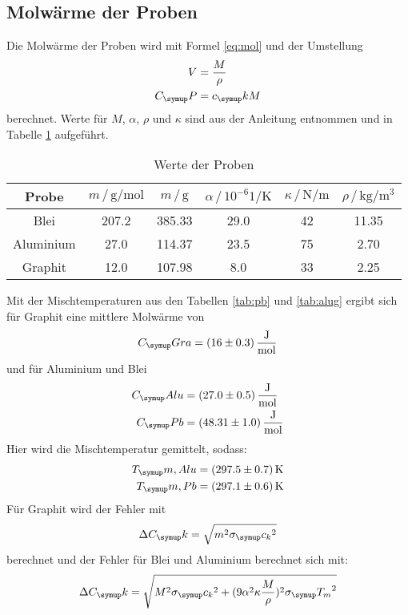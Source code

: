 \subsection{Molwärme der Proben}
Die Molwärme der Proben wird mit Formel \eqref{eq:mol} und der Umstellung
\begin{align*}
  V&=\frac{M}{\rho}\\
  C_\su{P} &= c_\su{k}M
\end{align*}
berechnet. Werte für $M$, $\alpha$, $\rho$ und $\kappa$ sind aus der Anleitung
\cite{201} entnommen und in Tabelle \ref{tab:mol} aufgeführt.
\begin{table}
  \centering
  \begin{tabular}{c | c c c c c}
    \toprule
    Probe & $m\,/\,\si{\gram\per\mol}$&$m\,/\,\si{\gram}$ &$\alpha\,/\,10^{-6}\si{1\per\kelvin}$
    &$\kappa\,/\,\si{\newton\per\meter}$&$\rho\,/\,\si{\kilo\gram\per\cubic
    \meter}$ \\
    \midrule
    Blei      & 207.2 & 385.33 & 29.0 & 42 & 11.35 \\
    Aluminium &  27.0 & 114.37 & 23.5 & 75 &  2.70 \\
    Graphit   &  12.0 & 107.98 &  8.0 & 33 &  2.25 \\
    \bottomrule
  \end{tabular}
  \caption{Werte der Proben}
  \label{tab:mol}
\end{table}
Mit der Mischtemperaturen aus den Tabellen \ref{tab:pb} und \ref{tab:alug}
ergibt sich für Graphit eine mittlere Molwärme von
\begin{equation*}
  C_\su{Gra}= (16\pm0.3)\,\si{\joule\per\mol}
\end{equation*}
und für Aluminium und Blei
\begin{align*}
  C_\su{Alu} &= (27.0\pm0.5)\,\si{\joule\per\mol} \\
  C_\su{Pb} &= (48.31\pm1.0)\,\si{\joule\per\mol}
\end{align*}
Hier wird die Mischtemperatur gemittelt, sodass:
\begin{align*}
  T_\su{m, Alu} &= (297.5\pm0.7)\Kel \\
  T_\su{m, Pb}  &= (297.1\pm0.6)\Kel
\end{align*}
Für Graphit wird der Fehler mit
\begin{equation*}
  \Delta C_\su{k}=\sqrt{m^2\sigma_\su{c_k}^2}
\end{equation*}
berechnet und der Fehler für Blei und Aluminium berechnet sich mit:
\begin{equation*}
  \Delta C_\su{k}=\sqrt{M^2\sigma_\su{c_k}^2+(9\alpha^2\kappa\frac{M}{\rho})^2
  \sigma_\su{T_m}^2}
\end{equation*}
